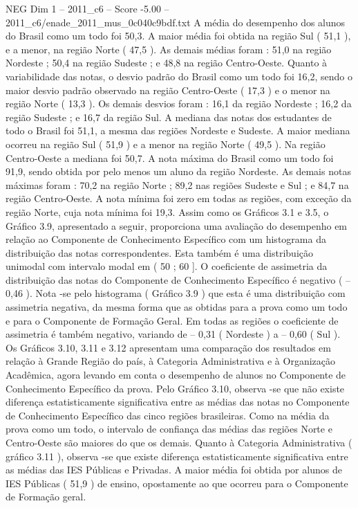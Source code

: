 \begin{textsample}{NEG Dim 1 – 2011\_c6 – Score -5.00 – 2011\_c6/enade\_2011\_mus\_0c040c9bdf.txt}
A média do desempenho dos alunos do Brasil como um todo foi 50,3.
A maior média foi obtida na região Sul ( 51,1 ), e a menor, na região Norte ( 47,5 ).
As demais médias foram : 51,0 na região Nordeste ; 50,4 na região Sudeste ; e 48,8 na região Centro-Oeste.
Quanto à variabilidade das notas, o desvio padrão do Brasil como um todo foi 16,2, sendo o maior desvio padrão observado na região Centro-Oeste ( 17,3 ) e o menor na região Norte ( 13,3 ).
Os demais desvios foram : 16,1 da região Nordeste ; 16,2 da região Sudeste ; e 16,7 da região Sul.
A mediana das notas dos estudantes de todo o Brasil foi 51,1, a mesma das regiões Nordeste e Sudeste.
A maior mediana ocorreu na região Sul ( 51,9 ) e a menor na região Norte ( 49,5 ).
Na região Centro-Oeste a mediana foi 50,7.
A nota máxima do Brasil como um todo foi 91,9, sendo obtida por pelo menos um aluno da região Nordeste.
As demais notas máximas foram : 70,2 na região Norte ; 89,2 nas regiões Sudeste e Sul ; e 84,7 na região Centro-Oeste.
A nota mínima foi zero em todas as regiões, com exceção da região Norte, cuja nota mínima foi 19,3.
Assim como os Gráficos 3.1 e 3.5, o Gráfico 3.9, apresentado a seguir, proporciona uma avaliação do desempenho em relação ao Componente de Conhecimento Específico com um histograma da distribuição das notas correspondentes.
Esta também é uma distribuição unimodal com intervalo modal em ( 50 ; 60 ].
O coeficiente de assimetria da distribuição das notas do Componente de Conhecimento Específico é negativo ( – 0,46 ).
Nota -se pelo histograma ( Gráfico 3.9 ) que esta é uma distribuição com assimetria negativa, da mesma forma que as obtidas para a prova como um todo e para o Componente de Formação Geral.
Em todas as regiões o coeficiente de assimetria é também negativo, variando de – 0,31 ( Nordeste ) a – 0,60 ( Sul ).
Os Gráficos 3.10, 3.11 e 3.12 apresentam uma comparação dos resultados em relação à Grande Região do país, à Categoria Administrativa e à Organização Acadêmica, agora levando em conta o desempenho de alunos no Componente de Conhecimento Específico da prova.
Pelo Gráfico 3.10, observa -se que não existe diferença estatisticamente significativa entre as médias das notas no Componente de Conhecimento Específico das cinco regiões brasileiras.
Como na média da prova como um todo, o intervalo de confiança das médias das regiões Norte e Centro-Oeste são maiores do que os demais.
Quanto à Categoria Administrativa ( gráfico 3.11 ), observa -se que existe diferença estatisticamente significativa entre as médias das IES Públicas e Privadas.
A maior média foi obtida por alunos de IES Públicas ( 51,9 ) de ensino, opostamente ao que ocorreu para o Componente de Formação geral.

\end{textsample}
